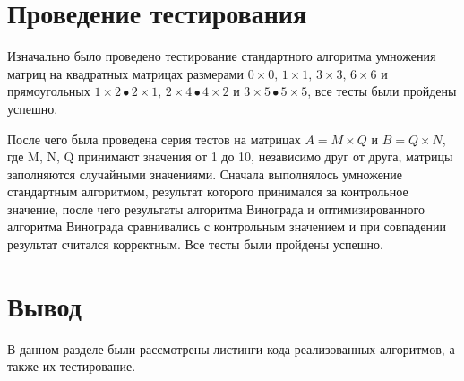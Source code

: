 \section{Проведение тестирования}
\label{sec:tests}
Изначально было проведено тестирование стандартного алгоритма умножения матриц на квадратных матрицах размерами $0\times0,\,1\times1,\,3\times3,\,6\times6$ и прямоугольных $1\times2\bullet 2\times1,\,2\times4\bullet4\times2$ и $3\times5\bullet5\times5$, все тесты были пройдены успешно.
\par После чего была проведена серия тестов на матрицах $A=M\times Q$ и $B=Q\times N$, где M, N, Q принимают значения от 1 до 10, независимо друг от друга, матрицы заполняются случайными значениями. Сначала выполнялось умножение стандартным алгоритмом, результат которого принимался за контрольное значение, после чего результаты алгоритма Винограда и оптимизированного алгоритма Винограда сравнивались с контрольным значением и при совпадении результат считался корректным. Все тесты были пройдены успешно.

\section{Вывод}
В данном разделе были рассмотрены листинги кода реализованных алгоритмов, а также их тестирование.
